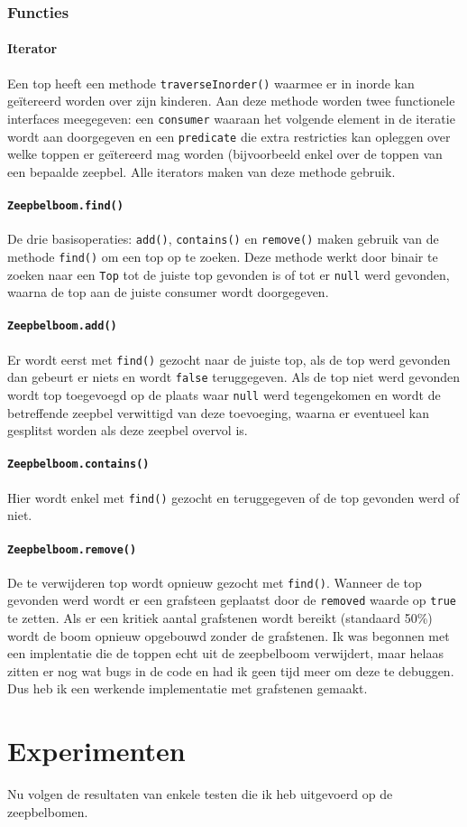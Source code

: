 \documentclass[12pt]{article}
\begin{document}
    \section{Functies}
    \subsection{Iterator}
    Een top heeft een methode {\tt traverseInorder()} waarmee er in inorde kan
    geïtereerd worden over zijn kinderen. Aan deze methode worden twee functionele
    interfaces meegegeven: een {\tt consumer} waaraan het volgende element in de iteratie
    wordt aan doorgegeven en een {\tt predicate} die extra restricties kan opleggen over
    welke toppen er geïtereerd mag worden (bijvoorbeeld enkel over de toppen van een
    bepaalde zeepbel.
    Alle iterators maken van deze methode gebruik.
    \subsection{\tt Zeepbelboom.find()}
    De drie basisoperaties: {\tt add()}, {\tt contains()} en {\tt remove()} maken gebruik
    van de methode {\tt find()} om een top op te zoeken. Deze methode werkt door binair
    te zoeken naar een {\tt Top} tot de juiste top gevonden is of tot er {\tt null} werd
    gevonden, waarna de top aan de juiste consumer wordt doorgegeven.
    \subsection{\tt Zeepbelboom.add()}
    Er wordt eerst met {\tt find()} gezocht naar de juiste top, als de top werd gevonden
    dan gebeurt er niets en wordt {\tt false} teruggegeven. Als de top niet werd gevonden
    wordt top toegevoegd op de plaats waar {\tt null} werd tegengekomen en wordt de
    betreffende zeepbel verwittigd van deze toevoeging, waarna er eventueel kan gesplitst
    worden als deze zeepbel overvol is.
    \subsection{\tt Zeepbelboom.contains()}
    Hier wordt enkel met {\tt find()} gezocht en teruggegeven of de top gevonden werd
    of niet.
    \subsection{\tt Zeepbelboom.remove()}
    De te verwijderen top wordt opnieuw gezocht met {\tt find()}. Wanneer de top gevonden
    werd wordt er een grafsteen geplaatst door de {\tt removed} waarde op {\tt true} te
    zetten. Als er een kritiek aantal grafstenen wordt bereikt (standaard 50\%) wordt
    de boom opnieuw opgebouwd zonder de grafstenen.
    \newline \newline
    Ik was begonnen met een implentatie die de toppen echt uit de zeepbelboom verwijdert,
    maar helaas zitten er nog wat bugs in de code en had ik geen tijd meer om deze te
    debuggen. Dus heb ik een werkende implementatie met grafstenen gemaakt.

    
    
    \newpage
    \part*{Experimenten}
    Nu volgen de resultaten van enkele testen die ik heb uitgevoerd op de zeepbelbomen.
    
\end{document}

